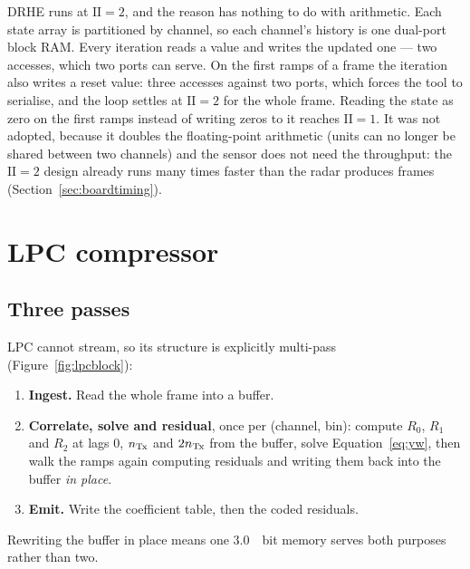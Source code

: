 DRHE runs at $\mathrm{II} = 2$, and the reason has nothing to do with
arithmetic. Each state array is partitioned by channel, so each channel's
history is one dual-port block RAM. Every iteration reads a value and writes
the updated one --- two accesses, which two ports can serve. On the first ramps
of a frame the iteration also writes a reset value: three accesses against two
ports, which forces the tool to serialise, and the loop settles at
$\mathrm{II} = 2$ for the whole frame. Reading the state as zero on the first
ramps instead of writing zeros to it reaches $\mathrm{II} = 1$. It was not
adopted, because it doubles the floating-point arithmetic (units can no longer
be shared between two channels) and the sensor does not need the throughput:
the $\mathrm{II} = 2$ design already runs many times faster than the radar
produces frames (Section~\ref{sec:boardtiming}).

\section{LPC compressor}
\label{sec:lpcimpl}

\subsection{Three passes}

LPC cannot stream, so its structure is explicitly multi-pass
(Figure~\ref{fig:lpcblock}):

\begin{enumerate}
\item \textbf{Ingest.} Read the whole frame into a buffer.
\item \textbf{Correlate, solve and residual}, once per (channel, bin): compute
$R_0$, $R_1$ and $R_2$ at lags $0$, $n_{\mathrm{Tx}}$ and $2n_{\mathrm{Tx}}$ from the buffer, solve
Equation~\eqref{eq:yw}, then walk the ramps again computing residuals and
writing them back into the buffer \emph{in place}.
\item \textbf{Emit.} Write the coefficient table, then the coded residuals.
\end{enumerate}

\noindent
Rewriting the buffer in place means one \SI{3.0}{\mebi bit} memory serves both
purposes rather than two.

